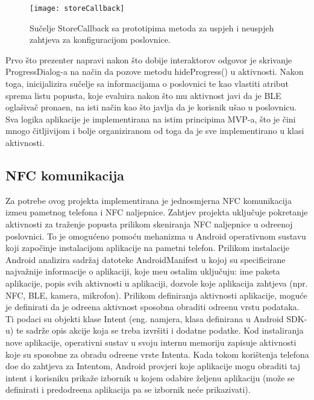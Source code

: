 \begin{figure}[!htbp]
	\begin{center}
 \texttt{[image: storeCallback]}
 \caption{Su\v{c}elje StoreCallback sa prototipima metoda za uspjeh i neuspjeh zahtjeva za konfiguracijom poslovnice.}
 \label{fig:storeCallback}
	\end{center}
\end{figure}

Prvo \v{s}to prezenter napravi nakon \v{s}to dobije interaktorov odgovor je skrivanje ProgressDialog-a na na\v{c}in da pozove metodu hideProgress() u aktivnosti. Nakon toga, inicijalizira su\v{c}elje sa informacijama o poslovnici te kao vlastiti atribut sprema listu popusta, koje evaluira nakon \v{s}to mu aktivnost javi da je BLE ogla\v{s}iva\v{c} prona\dj en, na isti na\v{c}in kao \v{s}to javlja da je korisnik u\v{s}ao u poslovnicu. Sva logika aplikacije je implementirana na istim principima MVP-a, \v{s}to je \v{c}ini mnogo \v{c}itljivijom i bolje organiziranom od toga da je sve implementirano u klasi aktivnosti.

\subsection{NFC komunikacija}

Za potrebe ovog projekta implementirana je jednosmjerna NFC komunikacija izme\dj u pametnog telefona i NFC naljepnice. Zahtjev projekta uklju\v{c}uje pokretanje aktivnosti za tra\v{z}enje popusta prilikom skeniranja NFC naljepnice u odre\dj enoj poslovnici. To je omogu\'{c}eno pomo\'{c}u mehanizma u Android operativnom sustavu koji zapo\v{c}inje instalacijom aplikacije na pametni telefon. Prilikom instalacije Android analizira sadr\v{z}aj datoteke AndroidManifest \cite{androidManifest} u kojoj su specificirane najva\v{z}nije informacije o aplikaciji, koje me\dj u ostalim uklju\v{c}uju: ime paketa aplikacije, popis svih aktivnosti u aplikaciji, dozvole koje aplikacija zahtjeva (npr. NFC, BLE, kamera, mikrofon). Prilikom definiranja aktivnosti aplikacije, mogu\'{c}e je definirati da je odre\dj ena aktivnost sposobna obraditi odre\dj enu vrstu podataka. Ti podaci su objekti klase Intent (eng. namjera, klasa definirana u Android SDK-u) te sadr\v{z}e opis akcije koja se treba izvr\v{s}iti i dodatne podatke. Kod instaliranja nove aplikacije, operativni sustav u svoju internu memoriju zapisuje aktivnosti koje su sposobne za obradu odre\dj ene vrste Intenta. Kada tokom kori\v{s}tenja telefona do\dj e do zahtjeva za Intentom, Android provjeri koje aplikacije mogu obraditi taj intent i korisniku prika\v{z}e izbornik u kojem odabire \v{z}eljenu aplikaciju (mo\v{z}e se definirati i predodre\dj ena aplikacija pa se izbornik ne\'{c}e prikazivati).

